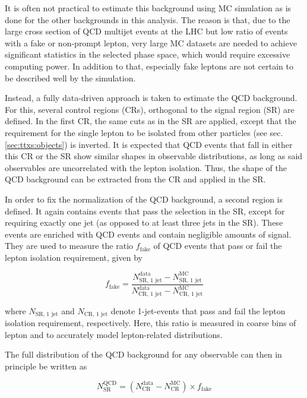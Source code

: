 It is often not practical to estimate this background using MC simulation as is done for the other backgrounds in this analysis. The reason is that, due to the large cross section of QCD multijet events at the LHC but low ratio of events with a fake or non-prompt lepton, very large MC datasets are needed to achieve significant statistics in the selected phase space, which would require excessive computing power. In addition to that, especially fake leptons are not certain to be described well by the simulation.

Instead, a fully data-driven approach is taken to estimate the QCD background. For this, several control regions (CRs), orthogonal to the signal region (SR) are defined. In the first CR, the same cuts as in the SR are applied, except that the requirement for the single lepton to be isolated from other particles (see sec. \ref{sec:ttxs:objects}) is inverted. It is expected that QCD events that fall in either this CR or the SR show similar shapes in observable distributions, as long as said observables are uncorrelated with the lepton isolation. Thus, the shape of the QCD background can be extracted from the CR and applied in the SR.

In order to fix the normalization of the QCD background, a second region is defined. It again contains events that pass the selection in the SR, except for requiring exactly one jet (as opposed to at least three jets in the SR). These events are enriched with QCD events and contain negligible amounts of \ttbar signal. They are used to measure the ratio $f_{\mathrm{fake}}$ of QCD events that pass or fail the lepton isolation requirement, given by

\begin{equation}
    f_{\mathrm{fake}} = \frac{ N_{\text{SR, 1 jet}}^{\text{data}} - N_{\text{SR, 1 jet}}^{\text{MC}} }{ N_{\text{CR, 1 jet}}^{\text{data}} - N_{\text{CR, 1 jet}}^{\text{MC}} }
\end{equation}

where $N_{\text{SR, 1 jet}}$ and $N_{\text{CR, 1 jet}}$ denote 1-jet-events that pass and fail the lepton isolation requirement, respectively. Here, this ratio is measured in coarse bins of lepton \pt and \abseta to accurately model lepton-related distributions.

The full distribution of the QCD background for any observable can then in principle be written as

\begin{equation}
    N_{\text{SR}}^{\text{QCD}} = ( N_{\text{CR}}^{\text{data}} - N_{\text{CR}}^{\text{MC}} ) \times f_{\mathrm{fake}}
\end{equation}

